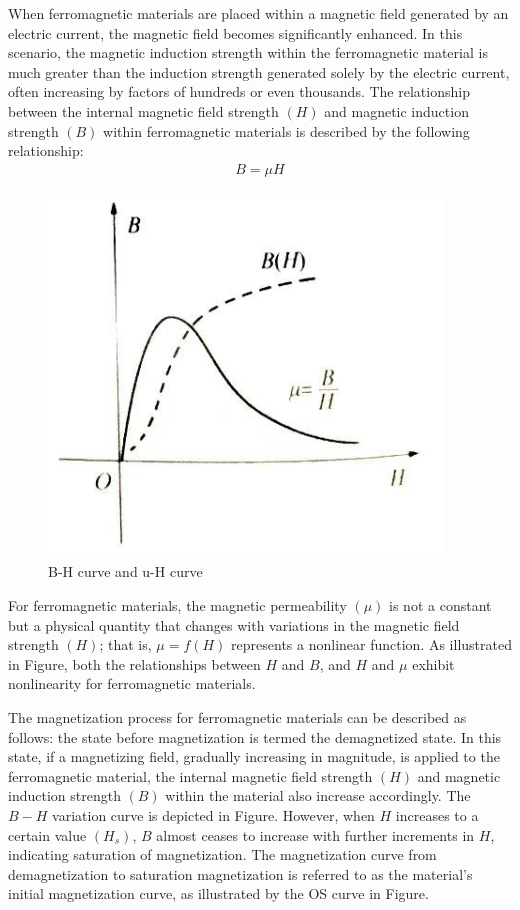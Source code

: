 \documentclass[UTF8]{article}
\begin{document}
   When ferromagnetic materials are placed within a magnetic field generated by an electric current, the magnetic field becomes significantly enhanced. In this scenario, the magnetic induction strength within the ferromagnetic material is much greater than the induction strength generated solely by the electric current, often increasing by factors of hundreds or even thousands. The relationship between the internal magnetic field strength $(H)$ and magnetic induction strength $(B)$ within ferromagnetic materials is described by the following relationship:
   \begin{eqnarray}
   B = \mu H
   \end{eqnarray}
   \begin{figure}[H]
   	    	\centering
   	    	\includegraphics[clip,scale=0.9,trim={0 0 0 0}]{fig/fig3.png}
   	        \caption{B-H curve and u-H curve}
   	        \label{figure.1}
       \end{figure}  
   
   For ferromagnetic materials, the magnetic permeability $(μ)$ is not a constant but a physical quantity that changes with variations in the magnetic field strength $(H)$; that is, $\mu = f(H)$ represents a nonlinear function. As illustrated in Figure, both the relationships between $H$ and $B$, and $H$ and $\mu$ exhibit nonlinearity for ferromagnetic materials. 
   
   The magnetization process for ferromagnetic materials can be described as follows: the state before magnetization is termed the demagnetized state. In this state, if a magnetizing field, gradually increasing in magnitude, is applied to the ferromagnetic material, the internal magnetic field strength $(H)$ and magnetic induction strength $(B)$ within the material also increase accordingly. The $B-H$ variation curve is depicted in Figure. However, when $H$ increases to a certain value $(H_s)$, $B$ almost ceases to increase with further increments in $H$, indicating saturation of magnetization. The magnetization curve from demagnetization to saturation magnetization is referred to as the material's initial magnetization curve, as illustrated by the OS curve in Figure.
   
\end{document}
